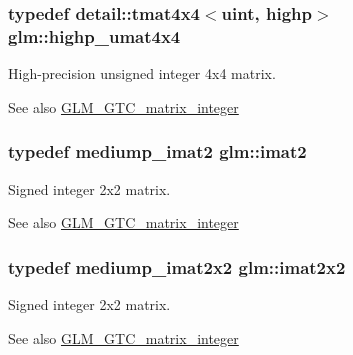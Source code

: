 \subsubsection[{\texorpdfstring{highp\+\_\+umat4x4}{highp_umat4x4}}]{\setlength{\rightskip}{0pt plus 5cm}typedef detail\+::tmat4x4$<$uint, highp$>$ {\bf glm\+::highp\+\_\+umat4x4}}\hypertarget{group__gtc__matrix__integer_gaa14b7029cfaf6f26384782f5ff7acddf}{}\label{group__gtc__matrix__integer_gaa14b7029cfaf6f26384782f5ff7acddf}
High-\/precision unsigned integer 4x4 matrix. \begin{DoxySeeAlso}{See also}
\hyperlink{group__gtc__matrix__integer}{G\+L\+M\+\_\+\+G\+T\+C\+\_\+matrix\+\_\+integer} 
\end{DoxySeeAlso}
\subsubsection[{\texorpdfstring{imat2}{imat2}}]{\setlength{\rightskip}{0pt plus 5cm}typedef mediump\+\_\+imat2 {\bf glm\+::imat2}}\hypertarget{group__gtc__matrix__integer_ga77a581b3366fb63fc72f8f20830003e0}{}\label{group__gtc__matrix__integer_ga77a581b3366fb63fc72f8f20830003e0}
Signed integer 2x2 matrix. \begin{DoxySeeAlso}{See also}
\hyperlink{group__gtc__matrix__integer}{G\+L\+M\+\_\+\+G\+T\+C\+\_\+matrix\+\_\+integer} 
\end{DoxySeeAlso}
\subsubsection[{\texorpdfstring{imat2x2}{imat2x2}}]{\setlength{\rightskip}{0pt plus 5cm}typedef mediump\+\_\+imat2x2 {\bf glm\+::imat2x2}}\hypertarget{group__gtc__matrix__integer_gaf7f44f44d966377666d41ed059524732}{}\label{group__gtc__matrix__integer_gaf7f44f44d966377666d41ed059524732}
Signed integer 2x2 matrix. \begin{DoxySeeAlso}{See also}
\hyperlink{group__gtc__matrix__integer}{G\+L\+M\+\_\+\+G\+T\+C\+\_\+matrix\+\_\+integer} 
\end{DoxySeeAlso}
